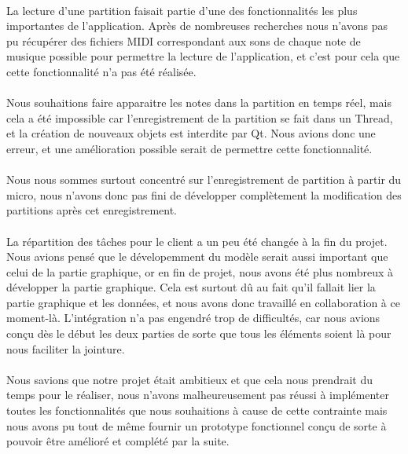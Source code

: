 \paragraph{}
La lecture d'une partition faisait partie d'une des fonctionnalités les plus importantes de l'application. Après 
de nombreuses recherches nous n'avons pas pu récupérer des fichiers MIDI correspondant aux sons de chaque 
note de musique possible pour permettre la lecture de l'application, et c'est pour cela que cette fonctionnalité 
n'a pas été réalisée.

\paragraph{}
Nous souhaitions faire apparaitre les notes dans la partition en temps réel, mais cela a été impossible car l'enregistrement de la partition se fait dans un Thread, et la création de nouveaux objets est 
interdite par Qt. Nous avions donc une erreur, et une amélioration possible serait de permettre cette fonctionnalité.

\paragraph{}
Nous nous sommes surtout concentré sur l'enregistrement de partition à partir du micro, nous n'avons donc pas fini 
de développer complètement la modification des partitions après cet enregistrement.

\paragraph{}
La répartition des tâches pour le client a un peu été changée à la fin du projet. Nous avions pensé que le dévelopemment 
du modèle serait aussi important que celui de la partie graphique, or en fin de projet, nous avons été plus nombreux à 
développer la partie graphique. Cela est surtout dû au fait qu'il fallait lier la partie graphique et les données, 
et nous avons donc travaillé en collaboration à ce moment-là. L'intégration n'a pas engendré trop de difficultés, car 
nous avions conçu dès le début les deux parties de sorte que tous les éléments soient là pour nous faciliter la jointure. 

\paragraph{}
Nous savions que notre projet était ambitieux et que cela nous prendrait du temps pour le réaliser, nous n'avons malheureusement 
pas réussi à implémenter toutes les fonctionnalités que nous souhaitions à cause de cette contrainte mais nous avons pu 
tout de même fournir un prototype fonctionnel conçu de sorte à pouvoir être amélioré et complété par la suite.